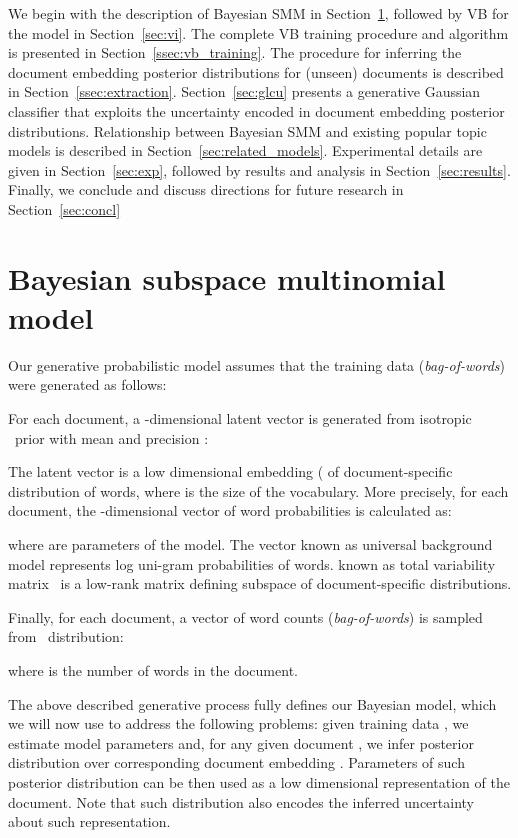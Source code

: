 \documentclass[journal]{IEEEtran}
\newcommand{\Mul}{}
\newcommand{\Gau}{}
\newcommand{\bow}{\textit{bag-of-words}}
\begin{document}
We begin with the description of Bayesian SMM in Section~\ref{sec:baysmm},
followed by VB for the model in Section~\ref{sec:vi}. The complete VB training
procedure and algorithm is presented in Section~\ref{ssec:vb_training}. The
procedure for inferring the document embedding posterior distributions for
(unseen) documents is described in Section~\ref{ssec:extraction}.
Section~\ref{sec:glcu} presents a generative Gaussian classifier that exploits
the uncertainty encoded in document embedding posterior distributions.
Relationship between Bayesian SMM and existing popular topic models is
described in Section~\ref{sec:related_models}. Experimental details are given
in Section~\ref{sec:exp}, followed by results and analysis in
Section~\ref{sec:results}. Finally, we conclude and discuss directions for 
future research in Section~\ref{sec:concl}

\section{Bayesian subspace multinomial model}
\label{sec:baysmm}
Our generative probabilistic model assumes that the training data (\bow)
were generated as follows:

For each document, a -dimensional latent vector  is
generated from isotropic \Gau~prior with mean  and precision :

The latent vector  is a low dimensional embedding ( of
document-specific distribution of words, where  is the size of the 
vocabulary. More precisely, for each document, the -dimensional vector of 
word probabilities is calculated as:

where  are parameters of the model. The vector  
known as universal background model represents log uni-gram probabilities of 
words.  known as total variability 
matrix~\cite{Marcel:2010:SMM,Najim:2011:ivec} is a low-rank matrix defining 
subspace of document-specific distributions.

Finally, for each document, a vector of word counts  (\bow) is sampled from \Mul~distribution:

where  is the number of words in the document.


The above described generative process fully defines our Bayesian model,
which we will now use to address the following problems: given training data
, we estimate model parameters  and,
for any given document , we infer posterior distribution over
corresponding document embedding .
Parameters of such posterior distribution can be then used as a low dimensional
representation of the document. Note that such distribution also encodes the
inferred uncertainty about such representation.
\end{document}
